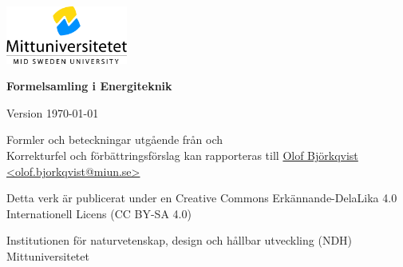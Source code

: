 \begin{titlepage}
    \begin{center}
        \includegraphics[width=0.3\textwidth, right]{MIUNLogo.jpg}
        \vspace*{4cm}
            
        \Huge
        \textbf{Formelsamling i Energiteknik} \par
            
        \Large
        \renewcommand{\dateseparator}{-}
        Version \today ~\currenttime
            
        \vspace{2,5cm}
            
            
        
        \vfill
            
		\normalsize
		Formler och beteckningar utgående från \cite{soleimani_mohseni_formelsamling_2018} och \cite{alvarez_energiteknik_2006} \\
		Korrekturfel och förbättringsförslag kan rapporteras till \href{mailto:olof.bjorkqvist@miun.se}{Olof Björkqvist <olof.bjorkqvist@miun.se>} \par
		Detta verk är publicerat under en Creative Commons Erkännande-DelaLika 4.0 Internationell Licens (CC BY-SA 4.0)

            
        \Large
        Institutionen för naturvetenskap, design och hållbar utveckling (NDH)\\
        Mittuniversitetet\\
            
    \end{center}
\end{titlepage}
